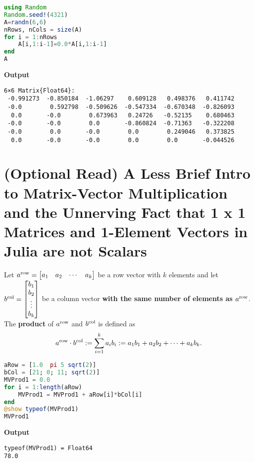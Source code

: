 \begin{lstlisting}[language=Julia,style=mystyle]
using Random
Random.seed!(4321)
A=randn(6,6)
nRows, nCols = size(A)
for i = 1:nRows
    A[i,1:i-1]=0.0*A[i,1:i-1]
end
A
\end{lstlisting}
\textbf{Output} 
\begin{verbatim}
6×6 Matrix{Float64}:
 -0.991273  -0.850184  -1.06297    0.609128   0.498376   0.411742
 -0.0        0.592798  -0.509626  -0.547334  -0.670348  -0.826093
  0.0       -0.0        0.673963   0.24726   -0.52135    0.680463
 -0.0       -0.0        0.0       -0.860824  -0.71363   -0.322208
 -0.0        0.0       -0.0        0.0        0.249046   0.373825
  0.0       -0.0       -0.0        0.0        0.0       -0.044526
\end{verbatim}


\section{(Optional Read) A Less Brief Intro to Matrix-Vector Multiplication and the Unnerving Fact that 1 x 1 Matrices and 1-Element Vectors in Julia are not Scalars}
\label{sec:AdjointVector}

Let $a^{\rm row}=\begin{bmatrix} a_1 & a_2 & \cdots & a_k \end{bmatrix}$ be a row vector with $k$ elements and let $b^{\rm col}= \begin{bmatrix} b_1 \\b_2 \\ \vdots \\b_k \end{bmatrix}$ be a column vector \textbf{with the same number of elements as $a^{\rm row}$}. The \textbf{product} of $a^{\rm row}$ and $b^{\rm col}$ is defined as 
\begin{equation}
\label{eq:VectorProductFormula02}
    a^{\rm row} \cdot b^{\rm col}:= \sum_{i=1}^k a_i b_i := a_1 b_1 + a_2 b_2 + \cdots + a_k b_k.
\end{equation}


\begin{lstlisting}[language=Julia,style=mystyle]
aRow = [1.0  pi 5 sqrt(2)]
bCol = [21; 0; 11; sqrt(2)]
MVProd1 = 0.0
for i = 1:length(aRow)
    MVProd1 = MVProd1 + aRow[i]*bCol[i]
end
@show typeof(MVProd1)
MVProd1
\end{lstlisting}
\textbf{Output} 
\begin{verbatim}
typeof(MVProd1) = Float64
78.0
\end{verbatim}

